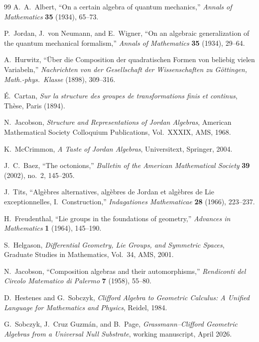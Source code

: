 \documentclass[11pt,a4paper]{article}
\theoremstyle{plain}
\theoremstyle{definition}
\theoremstyle{remark}
\numberwithin{equation}{section}
\begin{document}
\begin{thebibliography}{99}
A.~A.~Albert,
``On a certain algebra of quantum mechanics,''
\emph{Annals of Mathematics} \textbf{35} (1934), 65--73.

P.~Jordan, J.~von Neumann, and E.~Wigner,
``On an algebraic generalization of the quantum mechanical
formalism,''
\emph{Annals of Mathematics} \textbf{35} (1934), 29--64.

A.~Hurwitz,
``\"Uber die Composition der quadratischen Formen von beliebig
vielen Variabeln,''
\emph{Nachrichten von der Gesellschaft der Wissenschaften zu
G\"ottingen, Math.-phys.\ Klasse} (1898), 309--316.

\'E.~Cartan,
\emph{Sur la structure des groupes de transformations finis et
continus}, Th\`ese, Paris (1894).

N.~Jacobson,
\emph{Structure and Representations of Jordan Algebras},
American Mathematical Society Colloquium Publications,
Vol.~XXXIX, AMS, 1968.

K.~McCrimmon,
\emph{A Taste of Jordan Algebras},
Universitext, Springer, 2004.

J.~C.~Baez,
``The octonions,''
\emph{Bulletin of the American Mathematical Society} \textbf{39}
(2002), no.~2, 145--205.

J.~Tits,
``Alg\`ebres alternatives, alg\`ebres de Jordan et alg\`ebres de
Lie exceptionnelles, I.~Construction,''
\emph{Indagationes Mathematicae} \textbf{28} (1966), 223--237.

H.~Freudenthal,
``Lie groups in the foundations of geometry,''
\emph{Advances in Mathematics} \textbf{1} (1964), 145--190.

S.~Helgason,
\emph{Differential Geometry, Lie Groups, and Symmetric Spaces},
Graduate Studies in Mathematics, Vol.~34, AMS, 2001.

N.~Jacobson,
``Composition algebras and their automorphisms,''
\emph{Rendiconti del Circolo Matematico di Palermo} \textbf{7}
(1958), 55--80.

D.~Hestenes and G.~Sobczyk,
\emph{Clifford Algebra to Geometric Calculus: A Unified Language
for Mathematics and Physics}, Reidel, 1984.

G.~Sobczyk, J.~Cruz Guzm\'an, and B.~Page,
\emph{Grassmann--Clifford Geometric Algebras from a Universal
Null Substrate}, working manuscript, April 2026.


\end{thebibliography}
\end{document}
